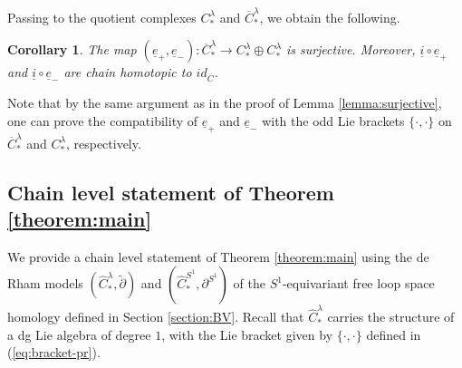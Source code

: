 \documentclass[a4paper]{article}
\newtheorem{corollary}[theorem]{Corollary}
\numberwithin{equation}{section}
\begin{document}
Passing to the quotient complexes $C_\ast^\lambda$ and $\overline{C}_\ast^\lambda$, we obtain the following.

\begin{corollary}\label{corollary:surjective}
The map $(\underline{e}_+,\underline{e}_-):\overline{C}_\ast^\lambda\rightarrow C_\ast^\lambda\oplus C_\ast^\lambda$ is surjective. Moreover, $\underline{i}\circ\underline{e}_+$ and $\underline{i}\circ\underline{e}_-$ are chain homotopic to $\mathit{id}_{\overline{C}}$.
\end{corollary}

Note that by the same argument as in the proof of Lemma \ref{lemma:surjective}, one can prove the compatibility of $\underline{e}_+$ and $\underline{e}_-$ with the odd Lie brackets $\{\cdot,\cdot\}$ on $\overline{C}_\ast^\lambda$ and $C_\ast^\lambda$, respectively.

\subsection{Chain level statement of Theorem \ref{theorem:main}}\label{section:chain}

We provide a chain level statement of Theorem \ref{theorem:main} using the de Rham models $(\widehat{C}_\ast^\lambda,\tilde{\partial})$ and $(\widehat{C}_\ast^{S^1},\partial^{S^1})$ of the $S^1$-equivariant free loop space homology defined in Section \ref{section:BV}. Recall that $\widehat{C}_\ast^\lambda$ carries the structure of a dg Lie algebra of degree $1$, with the Lie bracket given by $\{\cdot,\cdot\}$ defined in (\ref{eq:bracket-pr}).
\end{document}
